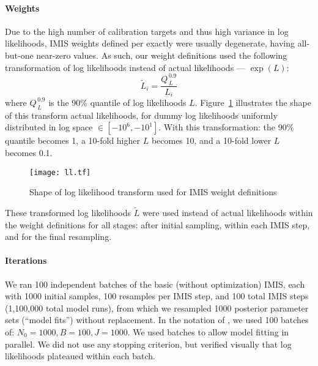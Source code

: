 \paragraph{Weights}
Due to the high number of calibration targets and thus high variance in log likelihoods,
IMIS weights defined per \cite{Raftery2010} exactly were usually degenerate,
having all-but-one near-zero values.
As such, our weight definitions used
the following transformation of log likelihoods
instead of actual likelihoods --- \ie $\exp(L)$:
\begin{equation}
  \tilde{L}_i = \frac{Q^{\,0.9}_{\,L}}{L_i}
\end{equation}
where $Q^{\,0.9}_{\,L}$ is the 90\% quantile of log likelihoods $L$.
Figure~\ref{fig:ll.tf} illustrates the shape of this transform \vs actual likelihoods,
for dummy log likelihoods uniformly distributed in log space $\in [-10^6,-10^1]$.
With this transformation: the 90\% quantile becomes 1,
a 10-fold higher $L$ becomes 10, and
a 10-fold lower $L$ becomes 0.1.
\begin{figure}[h]
  \centering\texttt{[image: ll.tf]}
  \caption{Shape of log likelihood transform used for IMIS weight definitions}
  \label{fig:ll.tf}
\end{figure}
These transformed log likelihoods $\tilde{L}$ were used instead of actual likelihoods
within the weight definitions for all stages:
after initial sampling, within each IMIS step, and for the final resampling.
\paragraph{Iterations}
We ran 100 independent batches of the basic (without optimization) IMIS,
each with 1000 initial samples, 100 resamples per IMIS step, and 100 total IMIS steps
(1,100,000 total model runs),
from which we resampled 1000 posterior parameter sets (``model fits'') without replacement.
In the notation of \cite{Raftery2010}, we used 100 batches of: $N_0 = 1000, B = 100, J = 1000$.
We used batches to allow model fitting in parallel.
We did not use any stopping criterion,
but verified visually that log likelihoods plateaued within each batch.
